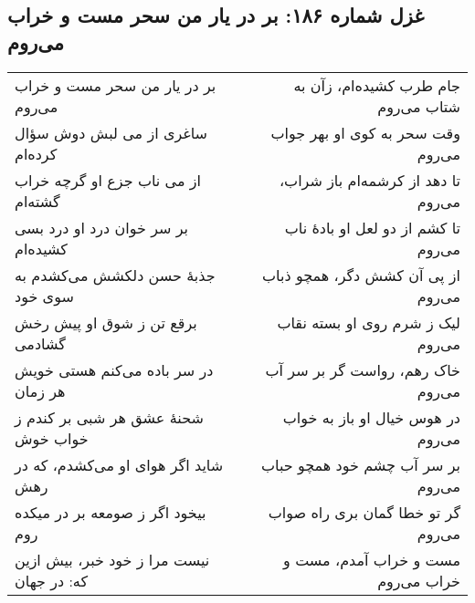 \begin{center}
\section*{غزل شماره ۱۸۶: بر در یار من سحر مست و خراب می‌روم}
\label{sec:186}
\begin{longtable}{l p{0.5cm} r}
بر در یار من سحر مست و خراب می‌روم
&&
جام طرب کشیده‌ام، زآن به شتاب می‌روم
\\
ساغری از می لبش دوش سؤال کرده‌ام
&&
وقت سحر به کوی او بهر جواب می‌روم
\\
از می ناب جزع او گرچه خراب گشته‌ام
&&
تا دهد از کرشمه‌ام باز شراب، می‌روم
\\
بر سر خوان درد او درد بسی کشیده‌ام
&&
تا کشم از دو لعل او بادهٔ ناب می‌روم
\\
جذبهٔ حسن دلکشش می‌کشدم به سوی خود
&&
از پی آن کشش دگر، همچو ذباب می‌روم
\\
برقع تن ز شوق او پیش رخش گشادمی
&&
لیک ز شرم روی او بسته نقاب می‌روم
\\
در سر باده می‌کنم هستی خویش هر زمان
&&
خاک رهم، رواست گر بر سر آب می‌روم
\\
شحنهٔ عشق هر شبی بر کندم ز خواب خوش
&&
در هوس خیال او باز به خواب می‌روم
\\
شاید اگر هوای او می‌کشدم، که در رهش
&&
بر سر آب چشم خود همچو حباب می‌روم
\\
بیخود اگر ز صومعه بر در میکده روم
&&
گر تو خطا گمان بری راه صواب می‌روم
\\
نیست مرا ز خود خبر، بیش ازین که: در جهان
&&
مست و خراب آمدم، مست و خراب می‌روم
\\
\end{longtable}
\end{center}
